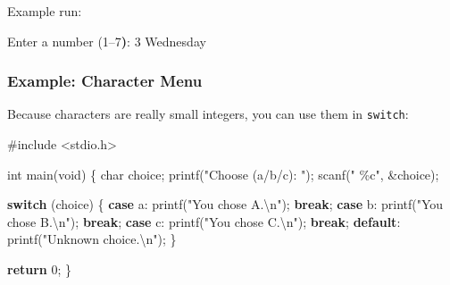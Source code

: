 \documentclass[
  letterpaper,
  DIV=11,
  numbers=noendperiod]{scrreprt}
\newenvironment{Shaded}{\begin{snugshade}}{\end{snugshade}}
\newcommand{\BuiltInTok}[1]{\textcolor[rgb]{0.00,0.23,0.31}{#1}}
\newcommand{\CharTok}[1]{\textcolor[rgb]{0.13,0.47,0.30}{#1}}
\newcommand{\ControlFlowTok}[1]{\textcolor[rgb]{0.00,0.23,0.31}{\textbf{#1}}}
\newcommand{\DataTypeTok}[1]{\textcolor[rgb]{0.68,0.00,0.00}{#1}}
\newcommand{\DecValTok}[1]{\textcolor[rgb]{0.68,0.00,0.00}{#1}}
\newcommand{\ErrorTok}[1]{\textcolor[rgb]{0.68,0.00,0.00}{#1}}
\newcommand{\ExtensionTok}[1]{\textcolor[rgb]{0.00,0.23,0.31}{#1}}
\newcommand{\ImportTok}[1]{\textcolor[rgb]{0.00,0.46,0.62}{#1}}
\newcommand{\KeywordTok}[1]{\textcolor[rgb]{0.00,0.23,0.31}{\textbf{#1}}}
\newcommand{\NormalTok}[1]{\textcolor[rgb]{0.00,0.23,0.31}{#1}}
\newcommand{\OperatorTok}[1]{\textcolor[rgb]{0.37,0.37,0.37}{#1}}
\newcommand{\PreprocessorTok}[1]{\textcolor[rgb]{0.68,0.00,0.00}{#1}}
\newcommand{\SpecialCharTok}[1]{\textcolor[rgb]{0.37,0.37,0.37}{#1}}
\newcommand{\StringTok}[1]{\textcolor[rgb]{0.13,0.47,0.30}{#1}}
\begin{document}
Example run:

\begin{Shaded}
\begin{Highlighting}[]
\ExtensionTok{Enter}\NormalTok{ a number }\ErrorTok{(}\ExtensionTok{1–7}\KeywordTok{)}\BuiltInTok{:}\NormalTok{ 3}
\ExtensionTok{Wednesday}
\end{Highlighting}
\end{Shaded}

\subsubsection{Example: Character Menu}\label{example-character-menu}

Because characters are really small integers, you can use them in
\texttt{switch}:

\begin{Shaded}
\begin{Highlighting}[]
\PreprocessorTok{\#include }\ImportTok{\textless{}stdio.h\textgreater{}}

\DataTypeTok{int}\NormalTok{ main}\OperatorTok{(}\DataTypeTok{void}\OperatorTok{)} \OperatorTok{\{}
    \DataTypeTok{char}\NormalTok{ choice}\OperatorTok{;}
\NormalTok{    printf}\OperatorTok{(}\StringTok{"Choose (a/b/c): "}\OperatorTok{);}
\NormalTok{    scanf}\OperatorTok{(}\StringTok{" }\SpecialCharTok{\%c}\StringTok{"}\OperatorTok{,} \OperatorTok{\&}\NormalTok{choice}\OperatorTok{);}

    \ControlFlowTok{switch} \OperatorTok{(}\NormalTok{choice}\OperatorTok{)} \OperatorTok{\{}
        \ControlFlowTok{case} \CharTok{\textquotesingle{}a\textquotesingle{}}\OperatorTok{:}\NormalTok{ printf}\OperatorTok{(}\StringTok{"You chose A.}\SpecialCharTok{\textbackslash{}n}\StringTok{"}\OperatorTok{);} \ControlFlowTok{break}\OperatorTok{;}
        \ControlFlowTok{case} \CharTok{\textquotesingle{}b\textquotesingle{}}\OperatorTok{:}\NormalTok{ printf}\OperatorTok{(}\StringTok{"You chose B.}\SpecialCharTok{\textbackslash{}n}\StringTok{"}\OperatorTok{);} \ControlFlowTok{break}\OperatorTok{;}
        \ControlFlowTok{case} \CharTok{\textquotesingle{}c\textquotesingle{}}\OperatorTok{:}\NormalTok{ printf}\OperatorTok{(}\StringTok{"You chose C.}\SpecialCharTok{\textbackslash{}n}\StringTok{"}\OperatorTok{);} \ControlFlowTok{break}\OperatorTok{;}
        \ControlFlowTok{default}\OperatorTok{:}\NormalTok{  printf}\OperatorTok{(}\StringTok{"Unknown choice.}\SpecialCharTok{\textbackslash{}n}\StringTok{"}\OperatorTok{);}
    \OperatorTok{\}}

    \ControlFlowTok{return} \DecValTok{0}\OperatorTok{;}
\OperatorTok{\}}
\end{Highlighting}
\end{Shaded}
\end{document}
